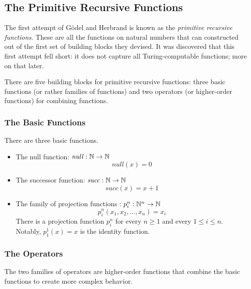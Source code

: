\subsection{The Primitive Recursive Functions}

The first attempt of Gödel and Herbrand is known as the \emph{primitive
recursive functions}. These are all the functions on natural numbers that can
constructed out of the first set of building blocks they devised. It was discovered
that this first attempt fell short: it does not capture all Turing-computable
functions; more on that later.

There are five building blocks for primitive recursive functions: three basic
functions (or rather families of functions) and two operators (or higher-order
functions)
for combining functions.

\subsubsection{The Basic Functions}
There are three basic functions.
\begin{itemize}
\item
The null function: $\mathit{null} : \mathbb{N} \rightarrow \mathbb{N}$
\begin{equation*}
\mathit{null}(x) = 0
\end{equation*}

\item
The successor function: $\mathit{succ} : \mathbb{N} \rightarrow \mathbb{N}$
\begin{equation*}
\mathit{succ}(x) = x + 1
\end{equation*}

\item
The family of projection functions : $p_i^n : \mathbb{N}^n \rightarrow \mathbb{N}$
\begin{equation*}
p_i^n(x_1,x_2,...,x_n) = x_i
\end{equation*}
There is a projection function $p_i^n$ for every $n \geq 1$ and every $1 \leq
i \leq n$. Notably, $p_1^1(x) = x$ is the identity function.
\end{itemize}

\subsubsection{The Operators}

The two families of operators are higher-order functions that combine the basic
functions to create more complex behavior.

